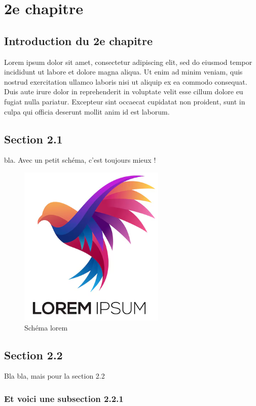 
\chapter{2e chapitre}

\section*{Introduction du 2e chapitre}

Lorem ipsum dolor sit amet, consectetur adipiscing elit, sed do eiusmod tempor incididunt ut labore et dolore magna aliqua. Ut enim ad minim veniam, quis nostrud exercitation ullamco laboris nisi ut aliquip ex ea commodo consequat. Duis aute irure dolor in reprehenderit in voluptate velit esse cillum dolore eu fugiat nulla pariatur. Excepteur sint occaecat cupidatat non proident, sunt in culpa qui officia deserunt mollit anim id est laborum.

\section{Section 2.1}

bla.
Avec un petit schéma, c'est toujours mieux !
\begin{figure}[H]
    \centering
    \includegraphics[width=0.45\linewidth]{Images/10/lorem.png}
    \caption{Schéma lorem}
    \label{fig:LoremLabel}
\end{figure}

\section{Section 2.2}
Bla bla, mais pour la section 2.2 

\subsection{Et voici une subsection 2.2.1}

